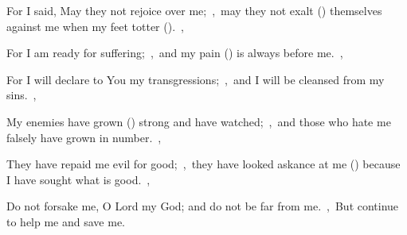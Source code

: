 \documentclass[12pt,twoside,a5paper]{article}
\begin{document}
\begin{normalparskip}
  For I said, May they not rejoice over me;~\sep\ may they not exalt () themselves against me when my feet totter ().~\sep

  For I am ready for suffering;~\sep\ and my pain () is always before me.~\sep

  For I will declare to You my transgressions;~\sep\ and I will be cleansed from my sins.~\sep

  My enemies have grown () strong and have watched;~\sep\ and those who hate me falsely have grown in number.~\sep

  They have repaid me evil for good;~\sep\ they have looked askance at me () because I have sought what is good.~\sep

  Do not forsake me, O Lord my God; and do not be far from me.~\sep\ But continue to help me and save me.
\end{normalparskip}

\end{document}
